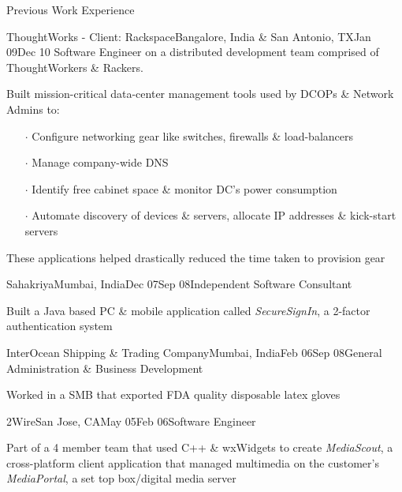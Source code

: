 \documentclass{resume} %
\begin{document}
\begin{rSection}{Previous Work Experience}

\begin{rSubsection}{ThoughtWorks - Client: Rackspace}{Bangalore, India \& San Antonio,
  TX}{Jan 09}{Dec
    10}
{Software Engineer on a distributed development team comprised of ThoughtWorkers \& Rackers.}

\item Built mission-critical data-center management tools used by DCOPs \& Network Admins to:
\vspace{-0.5em}
\begin{itemize}  \itemsep0.5pt \parskip0pt
    \item[$\cdot$] Configure networking gear like switches, firewalls \& load-balancers
    \item[$\cdot$] Manage company-wide DNS
    \item[$\cdot$] Identify free cabinet space \& monitor DC's power consumption
    \item[$\cdot$] Automate discovery of devices \& servers, allocate IP addresses \& kick-start servers
\end{itemize}
\item These applications helped drastically reduced the time taken to provision gear
\end{rSubsection}


\begin{rSubsection}{Sahakriya}{Mumbai, India}{Dec 07}{Sep 08}{Independent Software Consultant}
\item Built a Java based PC \& mobile application called {\em SecureSignIn}, a 2-factor authentication system

\end{rSubsection}


\begin{rSubsection}{InterOcean Shipping \& Trading Company}{Mumbai,
    India}{Feb 06}{Sep 08}{General Administration \& Business Development}
\item Worked in a SMB that exported FDA quality disposable latex gloves
\end{rSubsection}


\begin{rSubsection}{2Wire}{San Jose, CA}{May 05}{Feb 06}{Software Engineer}
\item Part of a 4 member team that used C++ \& wxWidgets to create {\em MediaScout}, a cross-platform client application that managed multimedia on the customer's {\em MediaPortal}, a set top box/digital media server
\end{rSubsection}

\end{rSection}
\end{document}
